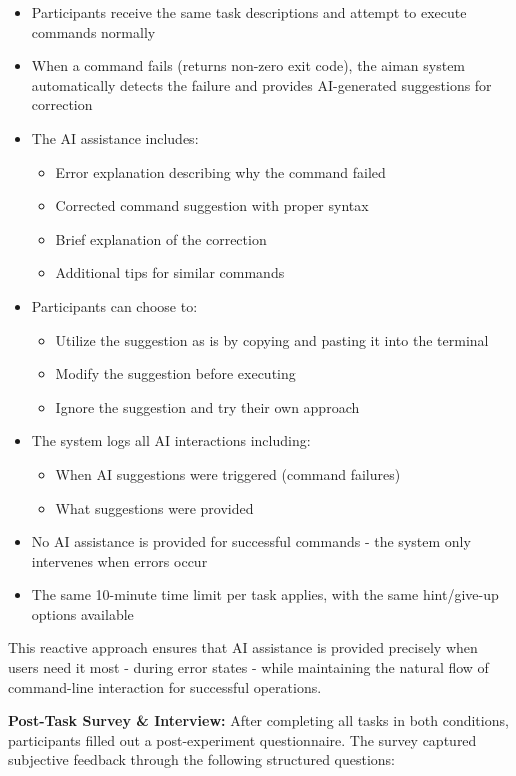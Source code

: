 \begin{itemize}
	\item Participants receive the same task descriptions and attempt to execute commands normally
	\item When a command fails (returns non-zero exit code), the aiman system automatically detects the failure and provides AI-generated suggestions for correction
	\item The AI assistance includes:
	\begin{itemize}
		\item Error explanation describing why the command failed
		\item Corrected command suggestion with proper syntax
		\item Brief explanation of the correction
		\item Additional tips for similar commands
	\end{itemize}
	\item Participants can choose to:
	\begin{itemize}
		\item Utilize the suggestion as is by copying and pasting it into the terminal
		\item Modify the suggestion before executing
		\item Ignore the suggestion and try their own approach
	\end{itemize}
	\item The system logs all AI interactions including:
	\begin{itemize}
		\item When AI suggestions were triggered (command failures)
		\item What suggestions were provided
	\end{itemize}
	\item No AI assistance is provided for successful commands - the system only intervenes when errors occur
	\item The same 10-minute time limit per task applies, with the same hint/give-up options available
\end{itemize}

This reactive approach ensures that AI assistance is provided precisely when users need it most - during error states - while maintaining the natural flow of command-line interaction for successful operations.

\textbf{Post-Task Survey \& Interview:} After completing all tasks in both conditions, participants filled out a post-experiment questionnaire. The survey captured subjective feedback through the following structured questions:

